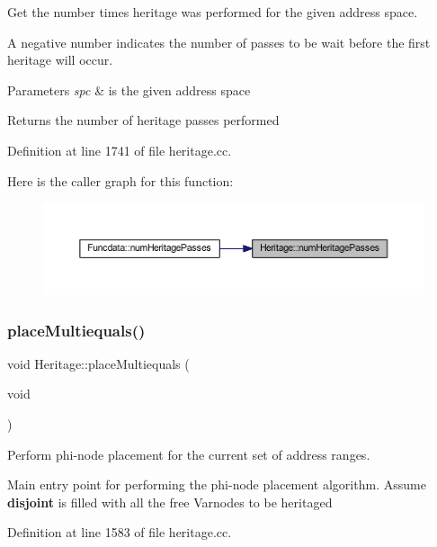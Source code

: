 Get the number times heritage was performed for the given address space. 

A negative number indicates the number of passes to be wait before the first heritage will occur. 
\begin{DoxyParams}{Parameters}
{\em spc} & is the given address space \\
\hline
\end{DoxyParams}
\begin{DoxyReturn}{Returns}
the number of heritage passes performed 
\end{DoxyReturn}


Definition at line 1741 of file heritage.\+cc.

Here is the caller graph for this function\+:
\nopagebreak
\begin{figure}[H]
\begin{center}
\leavevmode
\includegraphics[width=350pt]{class_heritage_ad5576d24243e351ea478fe5b1174370b_icgraph}
\end{center}
\end{figure}
\mbox{\label{class_heritage_acf14995e58b23df915ad06e9ff7f1165}} 
\subsubsection{\texorpdfstring{placeMultiequals()}{placeMultiequals()}}
{\footnotesize\ttfamily void Heritage\+::place\+Multiequals (\begin{DoxyParamCaption}\item[{void}]{ }\end{DoxyParamCaption})}



Perform phi-\/node placement for the current set of address ranges. 

Main entry point for performing the phi-\/node placement algorithm. Assume {\bfseries{disjoint}} is filled with all the free Varnodes to be heritaged 

Definition at line 1583 of file heritage.\+cc.

